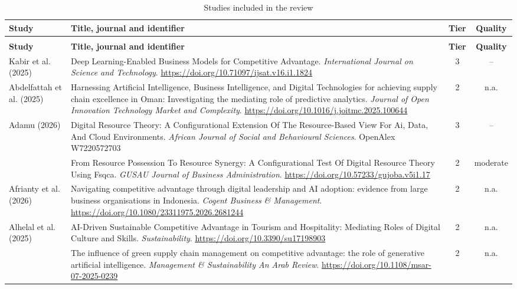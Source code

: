 {\singlespacing
\scriptsize
\renewcommand{\arraystretch}{1.1}\setlength{\tabcolsep}{4pt}
\begin{longtable}{|>{\raggedright\arraybackslash}p{2.6cm}|>{\raggedright\arraybackslash}p{10.2cm}|c|c|}
\caption{Studies included in the review}
\label{tab:included} \\
\hline
\textbf{Study} & \textbf{Title, journal and identifier} & \textbf{Tier} & \textbf{Quality} \\
\hline
\endfirsthead
\multicolumn{4}{|l|}{\scriptsize\textit{Table~\ref{tab:included} continued}} \\
\hline
\textbf{Study} & \textbf{Title, journal and identifier} & \textbf{Tier} & \textbf{Quality} \\
\hline
\endhead
\endfoot
Kabir et al. (2025) & Deep Learning-Enabled Business Models for Competitive Advantage. \textit{International Journal on Science and Technology}. \url{https://doi.org/10.71097/ijsat.v16.i1.1824} & 3 & -- \\ \hline
Abdelfattah et al. (2025) & Harnessing Artificial Intelligence, Business Intelligence, and Digital Technologies for achieving supply chain excellence in Oman: Investigating the mediating role of predictive analytics. \textit{Journal of Open Innovation Technology Market and Complexity}. \url{https://doi.org/10.1016/j.joitmc.2025.100644} & 2 & n.a. \\ \hline
Adamu (2026) & Digital Resource Theory: A Configurational Extension Of The Resource-Based View For Ai, Data, And Cloud Environments. \textit{African Journal of Social and Behavioural Sciences}. OpenAlex W7220572703 & 3 & -- \\ \hline
\textcite{adamu2026} & From Resource Possession To Resource Synergy: A Configurational Test Of Digital Resource Theory Using Fsqca. \textit{GUSAU Journal of Business Administration}. \url{https://doi.org/10.57233/gujoba.v5i1.17} & 2 & moderate \\ \hline
Afrianty et al. (2026) & Navigating competitive advantage through digital leadership and AI adoption: evidence from large business organisations in Indonesia. \textit{Cogent Business \& Management}. \url{https://doi.org/10.1080/23311975.2026.2681244} & 2 & n.a. \\ \hline
Alhelal et al. (2025) & AI-Driven Sustainable Competitive Advantage in Tourism and Hospitality: Mediating Roles of Digital Culture and Skills. \textit{Sustainability}. \url{https://doi.org/10.3390/su17198903} & 2 & n.a. \\ \hline
\textcite{almereb2026} & The influence of green supply chain management on competitive advantage: the role of generative artificial intelligence. \textit{Management \& Sustainability An Arab Review}. \url{https://doi.org/10.1108/msar-07-2025-0239} & 2 & n.a. \\ \hline

\end{longtable}}
